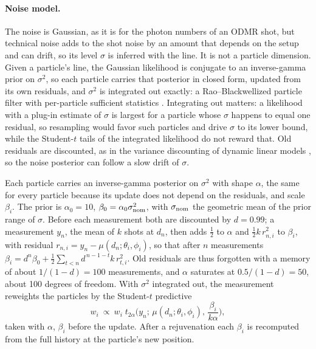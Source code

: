 \paragraph{Noise model.} The noise is Gaussian, as it is for the photon numbers of an ODMR shot, but technical
noise adds to the shot noise by an amount that depends on the setup and can drift, so its level $\sigma$ is inferred
with the line. It is not a particle dimension. Given a particle's line, the Gaussian likelihood is conjugate to an
inverse-gamma prior on $\sigma^2$, so each particle carries that posterior in closed form, updated from its own
residuals, and $\sigma^2$ is integrated out exactly: a Rao--Blackwellized particle filter with per-particle sufficient
statistics \cite{storvik2002,carvalho2010pl}. Integrating out matters: a likelihood with a plug-in estimate of
$\sigma$ is largest for a particle whose $\sigma$ happens to equal one residual, so resampling would favor such
particles and drive $\sigma$ to its lower bound, while the Student-$t$ tails of the integrated likelihood do not
reward that. Old residuals are discounted, as in the variance discounting of dynamic linear models
\cite{westharrison1997}, so the noise posterior can follow a slow drift of $\sigma$.

Each particle carries an inverse-gamma posterior on $\sigma^2$ with shape $\alpha$, the same
for every particle because its update does not depend on the residuals, and scale $\beta_i$. The prior is
$\alpha_0=10$, $\beta_0=\alpha_0\sigma_{\rm nom}^2$, with $\sigma_{\rm nom}$ the geometric mean of the prior range of
$\sigma$. Before each measurement both are discounted by $d=0.99$; a measurement $y_n$, the mean of $k$ shots at
$d_n$, then adds $\tfrac12$ to $\alpha$ and $\tfrac12 k\,r_{n,i}^2$ to $\beta_i$, with residual
$r_{n,i}=y_n-\mu(d_n;\theta_i,\phi_i)$, so that after $n$ measurements
$\beta_i=d^n\beta_0+\tfrac12\sum_{t<n}d^{\,n-1-t}k\,r_{t,i}^2$. Old residuals are thus forgotten with a memory of
about $1/(1-d)=100$ measurements, and $\alpha$ saturates at $0.5/(1-d)=50$, about 100 degrees of freedom. With
$\sigma^2$ integrated out, the measurement reweights the particles by the Student-$t$ predictive
\begin{equation}
  w_i\ \propto\ w_i\;t_{2\alpha}\!\Big(y_n;\,\mu(d_n;\theta_i,\phi_i),\,\frac{\beta_i}{k\alpha}\Big),
  \label{eq:smc-update}
\end{equation}
taken with $\alpha$, $\beta_i$ before the update. After a rejuvenation each $\beta_i$ is recomputed from the full
history at the particle's new position.

